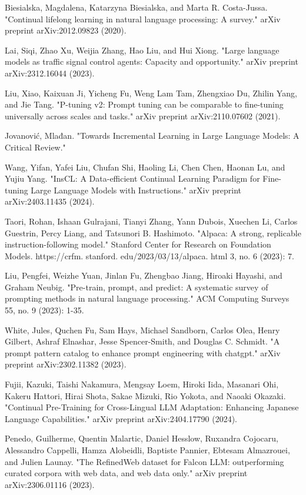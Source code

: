 \documentclass[runningheads]{llncs}
\begin{document}
\begin{thebibliography}{8}
Biesialska, Magdalena, Katarzyna Biesialska, and Marta R. Costa-Jussa. "Continual lifelong learning in natural language processing: A survey." arXiv preprint arXiv:2012.09823 (2020).

Lai, Siqi, Zhao Xu, Weijia Zhang, Hao Liu, and Hui Xiong. "Large language models as traffic signal control agents: Capacity and opportunity." arXiv preprint arXiv:2312.16044 (2023).

Liu, Xiao, Kaixuan Ji, Yicheng Fu, Weng Lam Tam, Zhengxiao Du, Zhilin Yang, and Jie Tang. "P-tuning v2: Prompt tuning can be comparable to fine-tuning universally across scales and tasks." arXiv preprint arXiv:2110.07602 (2021).

Jovanović, Mlađan. "Towards Incremental Learning in Large Language Models: A Critical Review."

Wang, Yifan, Yafei Liu, Chufan Shi, Haoling Li, Chen Chen, Haonan Lu, and Yujiu Yang. "InsCL: A Data-efficient Continual Learning Paradigm for Fine-tuning Large Language Models with Instructions." arXiv preprint arXiv:2403.11435 (2024).

Taori, Rohan, Ishaan Gulrajani, Tianyi Zhang, Yann Dubois, Xuechen Li, Carlos Guestrin, Percy Liang, and Tatsunori B. Hashimoto. "Alpaca: A strong, replicable instruction-following model." Stanford Center for Research on Foundation Models. https://crfm. stanford. edu/2023/03/13/alpaca. html 3, no. 6 (2023): 7.

Liu, Pengfei, Weizhe Yuan, Jinlan Fu, Zhengbao Jiang, Hiroaki Hayashi, and Graham Neubig. "Pre-train, prompt, and predict: A systematic survey of prompting methods in natural language processing." ACM Computing Surveys 55, no. 9 (2023): 1-35.

White, Jules, Quchen Fu, Sam Hays, Michael Sandborn, Carlos Olea, Henry Gilbert, Ashraf Elnashar, Jesse Spencer-Smith, and Douglas C. Schmidt. "A prompt pattern catalog to enhance prompt engineering with chatgpt." arXiv preprint arXiv:2302.11382 (2023).

Fujii, Kazuki, Taishi Nakamura, Mengsay Loem, Hiroki Iida, Masanari Ohi, Kakeru Hattori, Hirai Shota, Sakae Mizuki, Rio Yokota, and Naoaki Okazaki. "Continual Pre-Training for Cross-Lingual LLM Adaptation: Enhancing Japanese Language Capabilities." arXiv preprint arXiv:2404.17790 (2024).

Penedo, Guilherme, Quentin Malartic, Daniel Hesslow, Ruxandra Cojocaru, Alessandro Cappelli, Hamza Alobeidli, Baptiste Pannier, Ebtesam Almazrouei, and Julien Launay. "The RefinedWeb dataset for Falcon LLM: outperforming curated corpora with web data, and web data only." arXiv preprint arXiv:2306.01116 (2023).


\end{thebibliography}
\end{document}
